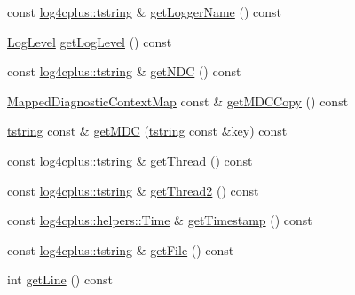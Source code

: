 \begin{DoxyCompactItemize}
\item 
const \hyperlink{namespacelog4cplus_a3c9287f6ebcddc50355e29d71152117b}{log4cplus\-::tstring} \& \hyperlink{classlog4cplus_1_1spi_1_1InternalLoggingEvent_aacbdd7c06e65e0f8884fda0eeab606f1}{get\-Logger\-Name} () const 
\item 
\hyperlink{namespacelog4cplus_abd332cc8c98fefcbbdcf57b6b3867de9}{Log\-Level} \hyperlink{classlog4cplus_1_1spi_1_1InternalLoggingEvent_a49084cf5c66d0e5f68cb5e4cc697595a}{get\-Log\-Level} () const 
\item 
const \hyperlink{namespacelog4cplus_a3c9287f6ebcddc50355e29d71152117b}{log4cplus\-::tstring} \& \hyperlink{classlog4cplus_1_1spi_1_1InternalLoggingEvent_a60c1022c398e5af353ab4983ff31c433}{get\-N\-D\-C} () const 
\item 
\hyperlink{namespacelog4cplus_a8b5b860e781a3d8d5c3d7d743a630b8a}{Mapped\-Diagnostic\-Context\-Map} const \& \hyperlink{classlog4cplus_1_1spi_1_1InternalLoggingEvent_aabdad5fac383443c007869641013afbc}{get\-M\-D\-C\-Copy} () const 
\item 
\hyperlink{namespacelog4cplus_a3c9287f6ebcddc50355e29d71152117b}{tstring} const \& \hyperlink{classlog4cplus_1_1spi_1_1InternalLoggingEvent_abd3c88a13a0ac4acb31c70cbf96a941a}{get\-M\-D\-C} (\hyperlink{namespacelog4cplus_a3c9287f6ebcddc50355e29d71152117b}{tstring} const \&key) const 
\item 
const \hyperlink{namespacelog4cplus_a3c9287f6ebcddc50355e29d71152117b}{log4cplus\-::tstring} \& \hyperlink{classlog4cplus_1_1spi_1_1InternalLoggingEvent_a78edfeb5da423f6e9c6f709316636261}{get\-Thread} () const 
\item 
const \hyperlink{namespacelog4cplus_a3c9287f6ebcddc50355e29d71152117b}{log4cplus\-::tstring} \& \hyperlink{classlog4cplus_1_1spi_1_1InternalLoggingEvent_a26de67bdac531f56479da6b06629692b}{get\-Thread2} () const 
\item 
const \hyperlink{namespacelog4cplus_1_1helpers_af05d40c37e1cccf9d11d0cbb7426bcd4}{log4cplus\-::helpers\-::\-Time} \& \hyperlink{classlog4cplus_1_1spi_1_1InternalLoggingEvent_a4a04b2f1a91f10f1cd41e7bc9bfd9a92}{get\-Timestamp} () const 
\item 
const \hyperlink{namespacelog4cplus_a3c9287f6ebcddc50355e29d71152117b}{log4cplus\-::tstring} \& \hyperlink{classlog4cplus_1_1spi_1_1InternalLoggingEvent_a11c1c224f844ac688535f8b647fbd2c1}{get\-File} () const 
\item 
int \hyperlink{classlog4cplus_1_1spi_1_1InternalLoggingEvent_a59717b8d99aa8963f14efd906096ed25}{get\-Line} () const 
\item 

\end{DoxyCompactItemize}
